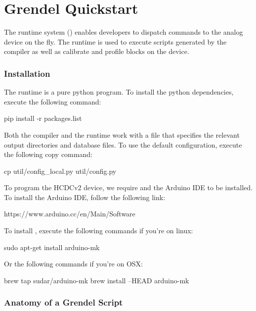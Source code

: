 \chapter{Grendel Quickstart}

The \grendel runtime system () enables developers to dispatch
commands to the \hcdc analog device on the fly. The \grendel runtime is used to
execute scripts generated by the \legno compiler as well as calibrate and profile
blocks on the device. 

\subsection{Installation}

The \grendel runtime is a pure python program. To install the python
dependencies, execute the following command:

\begin{snippet}
  pip install -r packages.list
\end{snippet}

Both the \legno compiler and the \grendel runtime work with a 
file that specifies the relevant output directories and database files. To use
the default configuration, execute the following copy command:

\begin{snippet}
cp util/config_local.py util/config.py
\end{snippet}

To program the HCDCv2 device, we require  and the Arduino IDE to
be installed. To install the Arduino IDE, follow the following link:

\begin{snippet}
https://www.arduino.cc/en/Main/Software
\end{snippet}

To install , execute the following commands if you're on linux:

\begin{snippet}
sudo apt-get install arduino-mk
\end{snippet}

Or the following commands if you're on OSX:
\begin{snippet}
brew tap sudar/arduino-mk
brew install --HEAD arduino-mk
\end{snippet}

\subsection{Anatomy of a Grendel Script}

